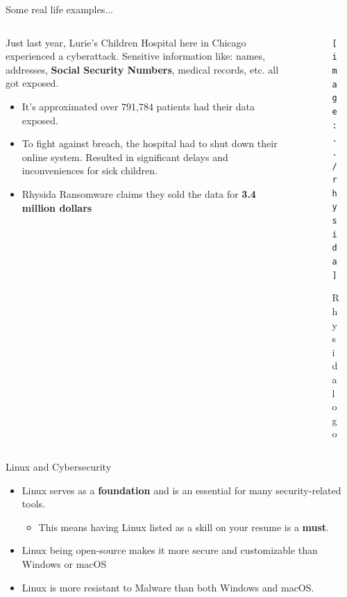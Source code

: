 \documentclass{beamer}
\begin{document}
\begin{frame}{Some real life examples...}
	\begin{columns}
		\begin{column}{0.5\textwidth}
			Just last year, Lurie's Children Hospital here in Chicago experienced a cyberattack. Sensitive information like: names, addresses, \textbf{Social Security Numbers}, medical records, etc. all got exposed.
			\pause
			\begin{itemize}
				\item It's approximated over 791,784 patients had their data exposed. 
				\pause
				\item To fight against breach, the hospital had to shut down their online system. Resulted in significant delays and inconveniences for sick children.
				\pause
				\item Rhysida Ransomware claims they sold the data for \textbf{3.4 million dollars}
				
			\end{itemize}
		\end{column}
		\begin{column}{0.5\textwidth}
			\begin{figure}
				\centering
				\texttt{[image: ../rhysida]}
				\caption{Rhysida logo}
				\label{fig:rhysida}
			\end{figure}
		\end{column}
	\end{columns}
\end{frame}

\begin{frame}{Linux and Cybersecurity}
	\begin{itemize}
		\item Linux serves as a \textbf{foundation} and is an essential for many security-related tools.
		\begin{itemize}
			\item This means having Linux listed as a skill on your resume is a \textbf{must}.
		\end{itemize}
		\pause
		\item Linux being open-source makes it more secure and customizable than Windows or macOS
		\pause
		\item Linux is more resistant to Malware than both Windows and macOS.
	\end{itemize}
\end{frame}
\end{document}
